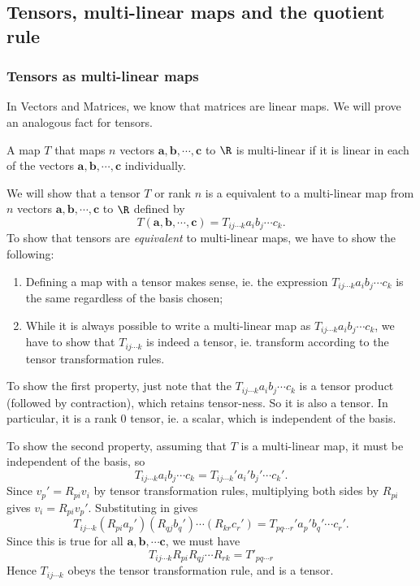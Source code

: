 \documentclass[a4paper]{article}
\begin{document}
\subsection{Tensors, multi-linear maps and the quotient rule}
\subsubsection{Tensors as multi-linear maps}
In Vectors and Matrices, we know that matrices are linear maps. We will prove an analogous fact for tensors.

\begin{defi}
  A map $T$ that maps $n$ vectors $\mathbf{a}, \mathbf{b}, \cdots, \mathbf{c}$ to $\R$ is multi-linear if it is linear in each of the vectors $\mathbf{a}, \mathbf{b}, \cdots, \mathbf{c}$ individually.
\end{defi}

We will show that a tensor $T$ or rank $n$ is a equivalent to a multi-linear map from $n$ vectors $\mathbf{a}, \mathbf{b}, \cdots, \mathbf{c}$ to $\R$ defined by
\[
  T(\mathbf{a}, \mathbf{b}, \cdots, \mathbf{c}) = T_{ij \cdots k} a_ib_j\cdots c_k.
\]
To show that tensors are \emph{equivalent} to multi-linear maps, we have to show the following:
\begin{enumerate}
  \item Defining a map with a tensor makes sense, ie. the expression $T_{ij\cdots k}a_ib_j\cdots c_k$ is the same regardless of the basis chosen;
  \item While it is always possible to write a multi-linear map as $T_{ij \cdots k} a_ib_j\cdots c_k$, we have to show that $T_{ij\cdots k}$ is indeed a tensor, ie. transform according to the tensor transformation rules.
\end{enumerate}

To show the first property, just note that the $T_{ij \cdots k} a_ib_j\cdots c_k$ is a tensor product (followed by contraction), which retains tensor-ness. So it is also a tensor. In particular, it is a rank 0 tensor, ie. a scalar, which is independent of the basis.

To show the second property, assuming that $T$ is a multi-linear map, it must be independent of the basis, so
\[
  T_{ij \cdots k} a_ib_j\cdots c_k = T_{ij\cdots k}' a_i' b_j' \cdots c_k'.
\]
Since $v_p' = R_{pi}v_i$ by tensor transformation rules, multiplying both sides by $R_{pi}$ gives $v_i = R_{pi} v_p'$. Substituting in gives
\[
  T_{ij\cdots k} (R_{pi}a_p')(R_{qj}b_q')\cdots (R_{kr}c_r') = T_{pq\cdots r}' a_p' b_q' \cdots c_r'.
\]
Since this is true for all $\mathbf{a}, \mathbf{b}, \cdots \mathbf{c}$, we must have
\[
  T_{ij\cdots k}R_{pi}R_{qj}\cdots R_{rk} = T'_{pq\cdots r}
\]
Hence $T_{ij\cdots k}$ obeys the tensor transformation rule, and is a tensor.
\end{document}
